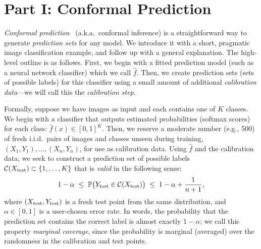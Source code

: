 \documentclass[11pt]{article}
\makeatletter
\theoremstyle{definition}
\renewcommand\section{\@startsection{section}{1}{\z@}{-3.5ex \@plus -1ex \@minus -.2ex}{2.3ex \@plus.2ex}{\normalfont\Large\bfseries\color{secblue}}}
\newcommand{\C}{\mathcal{C}}
\newcommand{\fhat}{\hat{f}}
\newcommand{\Xtest}{X_{\rm test}}
\newcommand{\Ytest}{Y_{\rm test}}
\newcommand{\PP}{\mathbb{P}}
\makeatother
\begin{document}
\part*{Part I: Conformal Prediction}

\section{Conformal Prediction}\label{sec:cp}

\emph{Conformal prediction}~\cite{vovk2005,gentle} (a.k.a.\ conformal inference) is a straightforward way to generate \emph{prediction sets} for any model. We introduce it with a short, pragmatic image classification example, and follow up with a general explanation. The high-level outline is as follows. First, we begin with a fitted prediction model (such as a neural network classifier) which we call $\fhat$. Then, we create prediction sets (sets of possible labels) for this classifier using a small amount of additional \emph{calibration data}---we will call this the \emph{calibration step}.

Formally, suppose we have images as input and each contains one of $K$ classes. We begin with a classifier that outputs estimated probabilities (softmax scores) for each class: $\fhat(x)\in[0,1]^K$. Then, we reserve a moderate number (e.g., 500) of fresh i.i.d.\ pairs of images and classes unseen during training, $(X_1,Y_1),\dots,(X_n,Y_n)$, for use as calibration data. Using $\fhat$ and the calibration data, we seek to construct a prediction set of possible labels $\C(\Xtest)\subset\{1,\dots,K\}$ that is \emph{valid} in the following sense:
\begin{equation}\label{eq:coverage}
1-\alpha \;\le\; \PP\big(\Ytest\in\C(\Xtest)\big) \;\le\; 1-\alpha+\frac{1}{n+1},
\end{equation}
where $(\Xtest,\Ytest)$ is a fresh test point from the same distribution, and $\alpha\in[0,1]$ is a user-chosen error rate. In words, the probability that the prediction set contains the correct label is almost exactly $1-\alpha$; we call this property \emph{marginal coverage}, since the probability is marginal (averaged) over the randomness in the calibration and test points.
\end{document}
